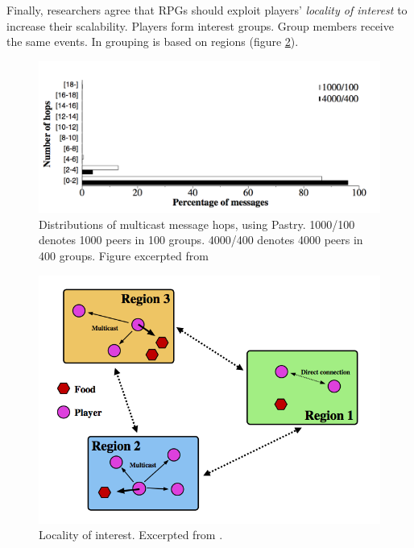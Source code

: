 \documentclass{article}
\begin{document}
Finally, researchers agree that RPGs should exploit players' \emph{locality of interest} to increase their scalability. Players form interest groups. Group members receive the same events. In \cite{Knutsson04} grouping is based on regions (figure \ref{fig:loi}).

\begin{figure}
\begin{center}
\includegraphics[scale=0.3]{images/hops.png}
\caption{Distributions of multicast message hops, using Pastry. 1000/100 denotes 1000 peers in 100 groups. 4000/400 denotes 4000 peers in 400 groups. Figure excerpted from \cite{Knutsson04}}
\label{fig:hops}
\end{center}
\end{figure}

\begin{figure}
\begin{center}
\includegraphics[scale=0.3]{images/loi.png}
\caption{Locality of interest. Excerpted from \cite{Knutsson04}.}
\label{fig:loi}
\end{center}
\end{figure}
\end{document}
